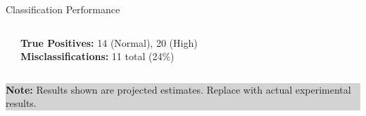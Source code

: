 \documentclass[aspectratio=169]{beamer}
\begin{document}
\begin{frame}{Classification Performance}
\begin{columns}[c]
\begin{center}
\end{center}

\small
\textbf{True Positives:} 14 (Normal), 20 (High)\\
\textbf{Misclassifications:} 11 total (24\%)
\end{columns}

\vspace{2mm}
\begin{center}
\colorbox{lightgray}{\parbox{0.9\textwidth}{\centering\small
\textbf{Note:} Results shown are projected estimates. Replace with actual experimental results.
}}
\end{center}
\end{frame}
\end{document}
